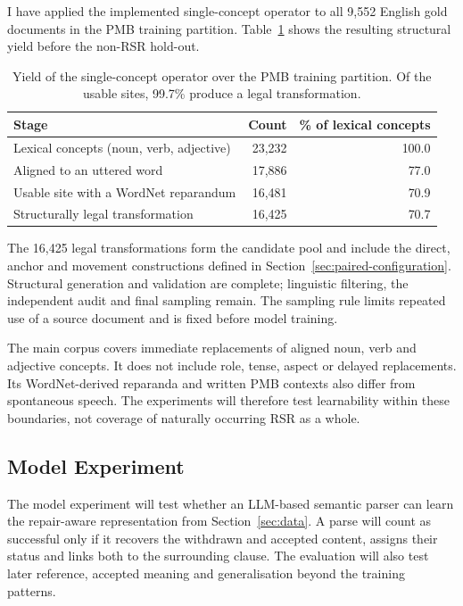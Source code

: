 \documentclass{article}
\begin{document}
I have applied the implemented single-concept operator to all 9,552 English
gold documents in the PMB training partition. Table~\ref{tab:coverage-funnel}
shows the resulting structural yield before the non-RSR hold-out.

\begin{table}[ht]
\centering
\small
\begin{tabular}{@{}lrr@{}}
\toprule
Stage & Count & \% of lexical concepts \\
\midrule
Lexical concepts (noun, verb, adjective) & 23,232 & 100.0 \\
Aligned to an uttered word               & 17,886 & 77.0 \\
Usable site with a WordNet reparandum    & 16,481 & 70.9 \\
Structurally legal transformation        & 16,425 & 70.7 \\
\bottomrule
\end{tabular}
\caption{Yield of the single-concept operator over the PMB training
partition. Of the usable sites, 99.7\% produce a legal transformation.}
\label{tab:coverage-funnel}
\end{table}

The 16,425 legal transformations form the candidate pool and include the
direct, anchor and movement constructions defined in
Section~\ref{sec:paired-configuration}. Structural generation and validation are complete;
linguistic filtering, the independent audit and final sampling remain. The
sampling rule limits repeated use of a source document and is fixed before
model training.

The main corpus covers immediate replacements of aligned noun, verb and
adjective concepts. It does not include role, tense, aspect or delayed
replacements. Its WordNet-derived reparanda and written PMB contexts also
differ from spontaneous speech. The experiments will therefore test learnability
within these boundaries, not coverage of naturally occurring RSR as a whole.


\subsection{Model Experiment}
\label{sec:model}

The model experiment will test whether an LLM-based semantic parser can learn
the repair-aware representation from Section~\ref{sec:data}. A parse will count
as successful only if it recovers the withdrawn and accepted content, assigns
their status and links both to the surrounding clause. The evaluation will
also test later reference, accepted meaning and generalisation beyond the
training patterns.
\end{document}
